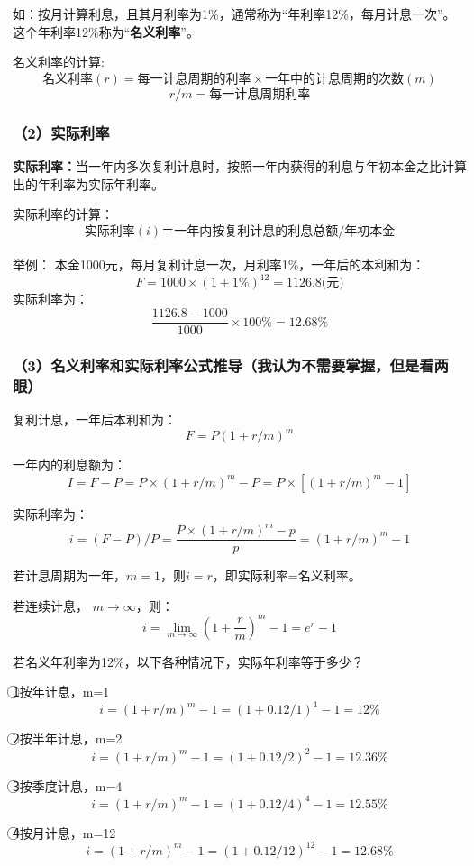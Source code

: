 如：按月计算利息，且其月利率为1\%，通常称为“年利率12\%，每月计息一次”。这个年利率12\%称为“\textbf{名义利率}”。

名义利率的计算:
$$\mbox{名义利率}(r) = \mbox{每一计息周期的利率} \times \mbox{一年中的计息周期的次数}(m)$$
$$r/m = \mbox{每一计息周期利率}$$

\subsubsection{（2）实际利率}
\textbf{实际利率：}当一年内多次复利计息时，按照一年内获得的利息与年初本金之比计算出的年利率为实际年利率。

实际利率的计算：
$$\mbox{实际利率}(i)＝\mbox{一年内按复利计息的利息总额}/\mbox{年初本金}$$\\
举例：
本金1000元，每月复利计息一次，月利率1\%，一年后的本利和为：
$$F = 1000 \times (1+1\%)^{12}= 1126.8 \mbox{(元)}$$
实际利率为：
$$\frac{1126.8-1000}{1000} \times 100\%=12.68\%$$

\subsubsection{（3）名义利率和实际利率公式推导（我认为不需要掌握，但是看两眼）}
复利计息，一年后本利和为：
$$F=P(1+r/m)^m$$

一年内的利息额为：
$$I=F-P=P \times (1+r/m)^m-P=P \times [(1+r/m)^m-1]$$

实际利率为：
$$i=(F-P)/P=\frac{P \times (1+r/m)^m-p}{p}=(1+r/m)^m-1$$

若计息周期为一年，$m = 1$，则$i = r$，即实际利率=名义利率。

若连续计息， $m \to \infty$，则：
$$i = \lim_{m \to \infty}(1+\frac{r}{m})^m-1=e^r-1$$

若名义年利率为12\%，以下各种情况下，实际年利率等于多少？

\textcircled{1}按年计息，m=1
$$i = (1+ r/m)^m-1=(1+0.12/1)^1-1=12\%$$

\textcircled{2}按半年计息，m=2
$$i = (1+ r/m)^m-1=(1+0.12/2)^2-1=12.36\%$$

\textcircled{3}按季度计息，m=4
$$i = (1+ r/m)^m-1=(1+0.12/4)^4-1=12.55\%$$

\textcircled{4}按月计息，m=12
$$i = (1+ r/m)^m-1=(1+0.12/12)^{12}-1=12.68\%$$

